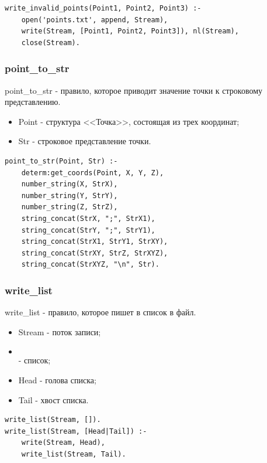 \begin{lstlisting}[caption=Реализация правила write\_invalid\_points, label=rules:writeinvalidpoints]
write_invalid_points(Point1, Point2, Point3) :-
	open('points.txt', append, Stream),
	write(Stream, [Point1, Point2, Point3]), nl(Stream),
	close(Stream).
\end{lstlisting}

\subsubsection{point\_to\_str}
\hspace{0.6cm} point\_to\_str - правило, которое приводит значение точки к строковому представлению.

\begin{itemize}
	\item Point - структура <<Точка>>, состоящая из трех координат;
	\item Str - строковое представление точки.
\end{itemize}

\begin{lstlisting}[caption=Реализация правила point\_to\_str, label=rules:pointtostr]
point_to_str(Point, Str) :-
	determ:get_coords(Point, X, Y, Z),
	number_string(X, StrX),
	number_string(Y, StrY),
	number_string(Z, StrZ),
	string_concat(StrX, ";", StrX1),
	string_concat(StrY, ";", StrY1),
	string_concat(StrX1, StrY1, StrXY),
	string_concat(StrXY, StrZ, StrXYZ),
	string_concat(StrXYZ, "\n", Str).
\end{lstlisting}

\subsubsection{write\_list}
\hspace{0.6cm} write\_list - правило, которое пишет в список в файл.

\begin{itemize}
	\item Stream - поток записи;
	\item \[\] - список;
	\item Head - голова списка;
	\item Tail - хвост списка.
\end{itemize}

\begin{lstlisting}[caption=Реализация правила write\_list, label=rules:writelist]
write_list(Stream, []).
write_list(Stream, [Head|Tail]) :-
	write(Stream, Head),
	write_list(Stream, Tail).
\end{lstlisting}

